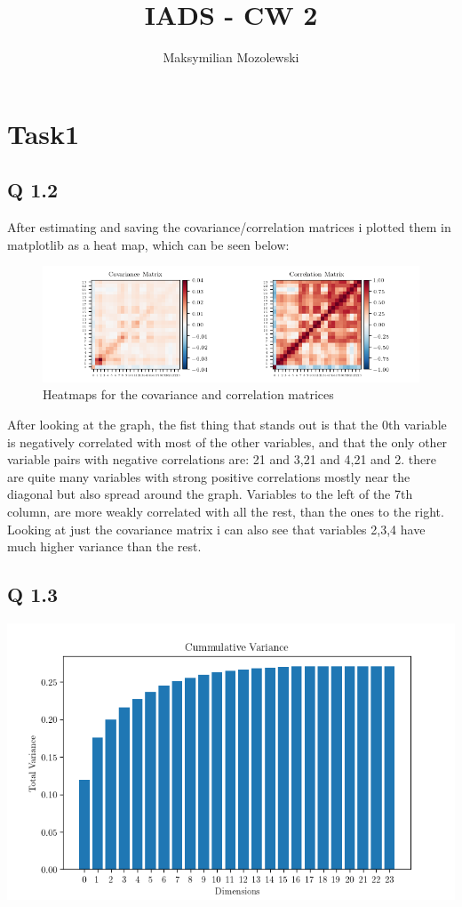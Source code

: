 \documentclass{report}
\begin{document}
\title{IADS - CW 2}
\author{Maksymilian Mozolewski}
\maketitle
\pagebreak
\section{Task1}

\subsection*{Q 1.2}
After estimating and saving the covariance/correlation matrices i plotted them in matplotlib as a heat map, which can be seen below:
\begin{figure}[h]
    \includegraphics[scale=1,left]{Years/Year2/Semester2/Learning/CW/python_code/correlation.png} 
    \caption{Heatmaps for the covariance and correlation matrices}
\end{figure}
After looking at the graph, the fist thing that stands out is that the 0th variable is negatively correlated with most of the other variables, and that the only other variable pairs with negative correlations are: 21 and 3,21 and 4,21 and 2. there are quite many variables with strong positive correlations mostly near the diagonal but also spread around the graph. Variables to the left of the 7th column, are more weakly correlated with all the rest, than the ones to the right. Looking at just the covariance matrix i can also see that variables 2,3,4 have much higher variance than the rest.
\subsection*{Q 1.3}
{
    \includegraphics{Years/Year2/Semester2/Learning/CW/python_code/cumvar.png}
    \caption{Figure 2: A graph of the cummulative variance of eigenvalues from the dataset}
}
\end{document}
